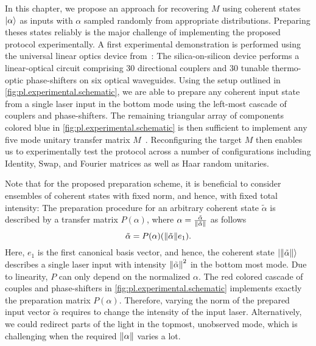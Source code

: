In this chapter, we propose an approach for recovering $M$ using coherent states $\ket{\alpha}$ as inputs with $\alpha$ sampled randomly from appropriate distributions.
Preparing theses states reliably is the major challenge of implementing the proposed protocol experimentally.
A first experimental demonstration is performed using the universal linear optics device from~\cite{Carolan_2015_Universal}:
The silica-on-silicon device performs a linear-optical circuit comprising 30 directional couplers and 30 tunable thermo-optic phase-shifters on six optical waveguides.
Using the setup outlined in \cref{fig:pl.experimental.schematic}, we are able to prepare any coherent input state from a single laser input in the bottom mode using the left-most cascade of couplers and phase-shifters.
The remaining triangular array of components colored blue in \cref{fig:pl.experimental.schematic} is then sufficient to implement any five mode unitary transfer matrix $M$~\cite{Reck_1994_Experimental}.
Reconfiguring the target $M$ then enables us to experimentally test the protocol across a number of configurations including Identity, Swap, and Fourier matrices as well as Haar random unitaries.

Note that for the proposed preparation scheme, it is beneficial to consider ensembles of coherent states with fixed norm, and hence, with fixed total intensity:
The preparation procedure for an arbitrary coherent state $\tilde\alpha$ is described by a transfer matrix $P(\alpha)$, where $\alpha = \frac{\tilde \alpha}{{\Vert\tilde \alpha\Vert}}$ as follows
\[
  \label{eq:pl.phaselift_P}
  \tilde\alpha = P(\alpha) ({\Vert\tilde\alpha\Vert} e_1).
\]
Here, $e_1$ is the first canonical basis vector, and hence, the coherent state $\ket{\norm{\tilde\alpha}}$ describes a single laser input with intensity ${\Vert\tilde\alpha\Vert}^2$ in the bottom most mode.
Due to linearity, $P$ can only depend on the normalized $\alpha$.
The red colored cascade of couples and phase-shifters in \cref{fig:pl.experimental.schematic} implements exactly the preparation matrix $P(\alpha)$.
Therefore, varying the norm of the prepared input vector $\tilde\alpha$ requires to change the intensity of the input laser.
Alternatively, we could redirect parts of the light in the topmost, unobserved mode, which is challenging when the required ${\Vert\alpha\Vert}$ varies a lot.\\



